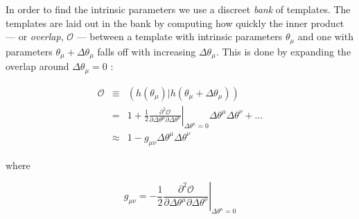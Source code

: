 In order to find the intrinsic parameters we use a discreet \emph{bank} of templates. The templates are laid out in the bank by computing how quickly the inner product --- or \emph{overlap}, $\mathcal{O}$ --- between a template with intrinsic parameters $\theta_\mu$ and one with parameters $\theta_\mu + \Delta\theta_\mu$ falls off with increasing $\Delta\theta_\mu$. This is done by expanding the overlap around $\Delta\theta_\mu = 0$ \cite{ref:Owen:1995,ref:OwenSathya:1998,ref:Babak.et.al:2006}:

\begin{eqnarray}
\label{eqn:OverlapSeries}
\mathcal{O} & \equiv & \left( h(\theta_\mu) | h(\theta_\mu + \Delta\theta_\mu) \right)  \\
        & = & 1 + \frac{1}{2} \left.\frac{\partial^2\mathcal{O}}{\partial \Delta\theta^\mu \partial \Delta\theta^\nu} \right|_{\Delta\theta^\kappa = 0} \Delta\theta^\mu \Delta\theta^\nu + \ldots \nonumber \\
        & \approx & 1 - g_{\mu \nu}\Delta\theta^\mu\Delta\theta^\nu
\end{eqnarray}

where 

\begin{equation}
\label{eqn:templateMetric}
g_{\mu \nu} = -\frac{1}{2} \left.\frac{\partial^2\mathcal{O}}{\partial \Delta\theta^\mu \partial \Delta\theta^\nu} \right|_{\Delta\theta^\kappa = 0}
\end{equation}

